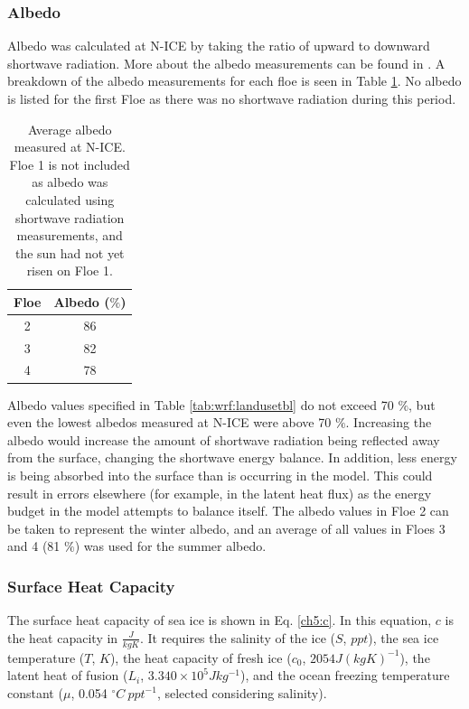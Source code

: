 \subsubsection{Albedo}
Albedo was calculated at N-ICE by taking the ratio of upward to downward shortwave radiation. More about the albedo measurements can be found in \citet{walden:2017}. A breakdown of the albedo measurements for each floe is seen in Table \ref{tab:albedos}. No albedo is listed for the first Floe as there was no shortwave radiation during this period. 

\begin{table}[h]
\centering
\footnotesize
\doublespacing 
{
\begin{tabular}{| c | c |}
 \hline
\rowcolor[HTML]{F3F3F3} \textbf{Floe} & \textbf{Albedo ($\%$)} \\
\hline
2 & 86 \\
3 & 82 \\
4 & 78 \\
 \hline
\end{tabular}}
\caption[N-ICE average measured albedo.]{Average albedo measured at N-ICE. Floe 1 is not included as albedo was calculated using shortwave radiation measurements, and the sun had not yet risen on Floe 1.}
\label{tab:albedos}
\end{table}

Albedo values specified in Table \ref{tab:wrf:landusetbl} do not exceed 70 $\%$, but even the lowest albedos measured at N-ICE were above 70 $\%$. Increasing the albedo would increase the amount of shortwave radiation being reflected away from the surface, changing the shortwave energy balance. In addition, less energy is being absorbed into the surface than is occurring in the model. This could result in errors elsewhere (for example, in the latent heat flux) as the energy budget in the model attempts to balance itself. The albedo values in Floe 2 can be taken to represent the winter albedo, and an average of all values in Floes 3 and 4 (81 $\%$) was used for the summer albedo.

\subsubsection{Surface Heat Capacity}
The surface heat capacity of sea ice is shown in Eq. \ref{ch5:c}. In this equation, $c$ is the heat capacity in $\frac{J}{kg K}$. It requires the salinity of the ice ($S$, $ppt$), the sea ice temperature ($T$, $K$), the heat capacity of fresh ice ($c_{0}$, $2054 J(kg K)^{-1}$), the latent heat of fusion ($L_{i}$, $3.340 \times 10^{5} Jkg^{-1}$), and the ocean freezing temperature constant ($\mu$, 0.054 $^{\circ}C~ppt^{-1}$, selected considering salinity). 

